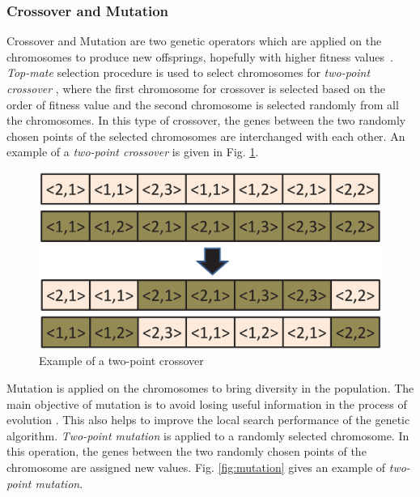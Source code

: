 \documentclass[conference]{IEEEtran}
\begin{document}
\subsubsection{Crossover and Mutation} Crossover and Mutation are two genetic operators which are applied on the chromosomes
to produce new offsprings, hopefully with higher fitness values~\cite{Goldberg}.
\emph{Top-mate} selection procedure is used to select chromosomes for \emph{two-point crossover} \cite{Goldberg}, where the first chromosome for crossover is selected based on the order of fitness value and the second chromosome is selected randomly from all the chromosomes. In this type of
crossover, the genes between the two randomly chosen points of the selected chromosomes are interchanged with each other.
An example of a \emph{two-point crossover} %
is given in Fig. \ref{fig:crossover}.

\begin{figure}[h]
	\begin{center}
		\includegraphics[scale=0.35]{crossover.eps}
	\end{center}
		\caption{Example of a two-point crossover}
	\label{fig:crossover}
\end{figure}


Mutation %
is applied on the chromosomes to bring diversity in the population. The main objective of mutation
is to avoid losing useful information in the process of evolution \cite{Goldberg}. This also helps to improve the local search performance
of the genetic algorithm. \emph{Two-point mutation} is applied to a randomly selected chromosome. In this operation, the genes between
the two randomly chosen points of the chromosome are assigned new values. Fig. \ref{fig:mutation} gives an example of  \emph{two-point mutation}. %
\end{document}
